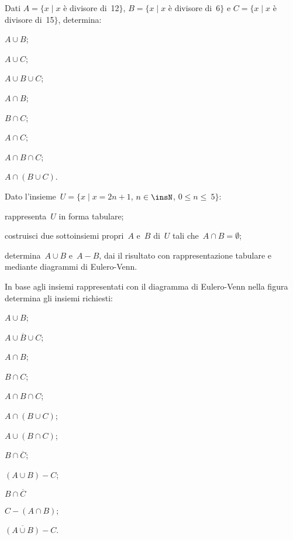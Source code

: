\begin{esercizio}
\label{ese:5.134}
Dati $A=\{x\mid x$ è divisore di~12$\}$, $B=\{x\mid x$ è divisore di~6$\}$ e
$C=\{x\mid x$ è divisore di~15$\}$, determina:
\begin{multicols}{4}
 \begin{enumeratea}
 \item $A\cup B$;
 \item $A\cup C$;
 \item $A\cup B\cup C$;
 \item $A\cap B$;
 \item $B\cap C$;
 \item $A\cap C$;
 \item $A\cap B\cap C$;
 \item $A\cap(B\cup C)$.
 \end{enumeratea}
\end{multicols}
\end{esercizio}

\begin{esercizio}
\label{ese:5.135}
Dato l'insieme~$U=\{x\mid x=2n+1$, $n\in\insN$, $0\le n\le~5\}$:

\begin{enumeratea}
\item rappresenta~$U$ in forma tabulare;
\item costruisci due sottoinsiemi propri~$A$ e~$B$ di~$U$ tali che~$A\cap B=\emptyset $;
\item determina~$A\cup B$ e~$A-B$, dai il risultato con rappresentazione tabulare e mediante diagrammi di
Eulero-Venn.
\end{enumeratea}
\end{esercizio}

\begin{esercizio}
\label{ese:5.136}
In base agli insiemi rappresentati con il diagramma di Eulero-Venn nella figura determina gli insiemi richiesti:
\begin{multicols}{2}
\begin{enumeratea}
\item $A\cup B$;
\item $\overline{A\cup B\cup C}$;
\item $A\cap B$;
\item $B\cap C$;
\item $A\cap B\cap C$;
\item $A\cap (B\cup C)$;
\item $A\cup (B\cap C)$;
\item $B\cap \overline{C}$;
\item $(A\cup B)-C$;
\item $B\cap \overline{C}$
\item $C-(A\cap B)$;
\item $\overline{(A\cup B)}-C$.
\end{enumeratea}
\begin{center}
 
\end{center}
\end{multicols}
\end{esercizio}

